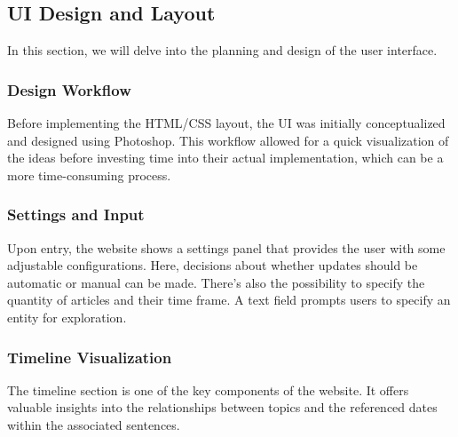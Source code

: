 \documentclass[a4paper,10pt]{report} %
\begin{document}
\subsection{UI Design and Layout}
In this section, we will delve into the planning and design of the user interface.

\subsubsection{Design Workflow}
Before implementing the HTML/CSS layout, the UI was initially conceptualized and designed using Photoshop. This workflow allowed for a quick visualization of the ideas before investing time into their actual implementation, which can be a more time-consuming process. %


\subsubsection{Settings and Input}
Upon entry, the website shows a settings panel that provides the user with some adjustable configurations. Here, decisions about whether updates should be automatic or manual can be made. There’s also the possibility to specify the quantity of articles and their time frame. A text field prompts users to specify an entity for exploration.



\subsubsection{Timeline Visualization}
 The timeline section is one of the key components of the website. It offers valuable insights into the relationships between topics and the referenced dates within the associated sentences.
\end{document}
